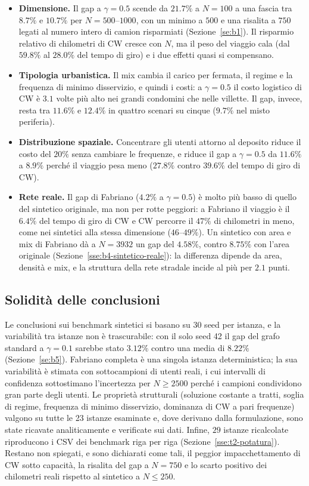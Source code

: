 \begin{itemize}
	\item \textbf{Dimensione.} Il gap a $\gamma=0.5$ scende da $21.7\%$ a $N=100$ a una fascia tra $8.7\%$ e $10.7\%$ per $N=500$--$1000$, con un minimo a $500$ e una risalita a $750$ legati al numero intero di camion risparmiati (Sezione~\ref{se:b1}). Il risparmio relativo di chilometri di CW cresce con $N$, ma il peso del viaggio cala (dal $59.8\%$ al $28.0\%$ del tempo di giro) e i due effetti quasi si compensano.
	\item \textbf{Tipologia urbanistica.} Il mix cambia il carico per fermata, il regime e la frequenza di minimo disservizio, e quindi i costi: a $\gamma=0.5$ il costo logistico di CW è $3.1$ volte più alto nei grandi condomini che nelle villette. Il gap, invece, resta tra $11.6\%$ e $12.4\%$ in quattro scenari su cinque ($9.7\%$ nel misto periferia).
	\item \textbf{Distribuzione spaziale.} Concentrare gli utenti attorno al deposito riduce il costo del $20\%$ senza cambiare le frequenze, e riduce il gap a $\gamma=0.5$ da $11.6\%$ a $8.9\%$ perché il viaggio pesa meno ($27.8\%$ contro $39.6\%$ del tempo di giro di CW).
	\item \textbf{Rete reale.} Il gap di Fabriano ($4.2\%$ a $\gamma=0.5$) è molto più basso di quello del sintetico originale, ma non per rotte peggiori: a Fabriano il viaggio è il $6.4\%$ del tempo di giro di CW e CW percorre il $47\%$ di chilometri in meno, come nei sintetici alla stessa dimensione ($46$--$49\%$). Un sintetico con area e mix di Fabriano dà a $N=3932$ un gap del $4.58\%$, contro $8.75\%$ con l'area originale (Sezione~\ref{sse:b4-sintetico-reale}): la differenza dipende da area, densità e mix, e la struttura della rete stradale incide al più per $2.1$ punti.
\end{itemize}

\subsection{Solidità delle conclusioni}\label{sse:disc-solidita}

Le conclusioni sui benchmark sintetici si basano su 30 seed per istanza, e la variabilità tra istanze non è trascurabile: con il solo seed 42 il gap del grafo standard a $\gamma=0.1$ sarebbe stato $3.12\%$ contro una media di $8.22\%$ (Sezione~\ref{se:b5}). Fabriano completa è una singola istanza deterministica; la sua variabilità è stimata con sottocampioni di utenti reali, i cui intervalli di confidenza sottostimano l'incertezza per $N\ge2500$ perché i campioni condividono gran parte degli utenti. Le proprietà strutturali (soluzione costante a tratti, soglia di regime, frequenza di minimo disservizio, dominanza di CW a pari frequenze) valgono su tutte le 23 istanze esaminate e, dove derivano dalla formulazione, sono state ricavate analiticamente e verificate sui dati. Infine, $29$ istanze ricalcolate riproducono i CSV dei benchmark riga per riga (Sezione~\ref{sse:t2-potatura}). Restano non spiegati, e sono dichiarati come tali, il peggior impacchettamento di CW sotto capacità, la risalita del gap a $N=750$ e lo scarto positivo dei chilometri reali rispetto al sintetico a $N\le250$.